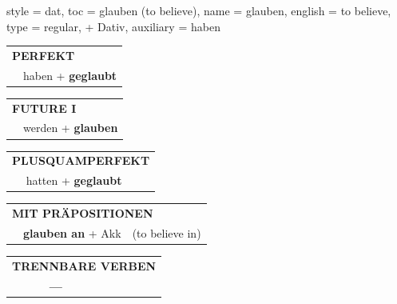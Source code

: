 \begin{verbentry}{
  style = {dat},
  toc = {glauben (to believe)},
  name = {glauben},
  english = {to believe},
  type = {regular, + Dativ},
  auxiliary = {haben}
}
    \vspace{10pt}

 \begin{tabular}{rl}
     \multicolumn{2}{l}{\textbf{PERFEKT}}\\
   & haben + \textbf{geglaubt}\\
  \end{tabular}
\hfill
   \begin{tabular}{rl}
   
    \multicolumn{2}{l}{\textbf{FUTURE I} }\\
   & werden + \textbf{glauben}\\
 
  \end{tabular}
\hfill
   \begin{tabular}{rl}
      \multicolumn{2}{l}{\textbf{PLUSQUAMPERFEKT}}\\
   & hatten + \textbf{geglaubt}\\
  \end{tabular}
  
\vspace{10pt}

\begin{tabular}{lll}
\multicolumn{3}{l}{\textbf{MIT PRÄPOSITIONEN}}\\
& \textbf{glauben an} + Akk & (to believe in)\\
\end{tabular}
\hfill
\begin{tabular}{lll}
\multicolumn{3}{l}{\textbf{TRENNBARE VERBEN}}\\
& \textbf{---} & \\
\end{tabular}

  \vspace{-5pt}
\end{verbentry}


